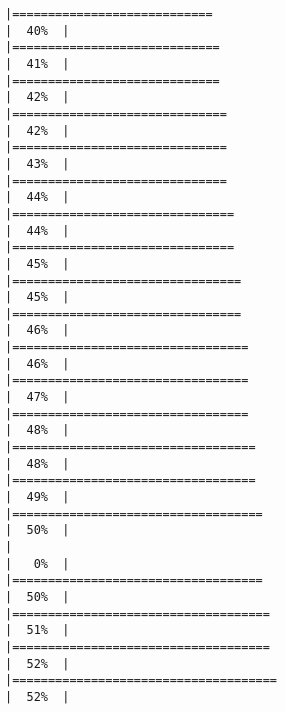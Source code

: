 \documentclass[
]{article}
\begin{document}
\begin{verbatim}
|============================                                          |  40%  |                                                                              |=============================                                         |  41%  |                                                                              |=============================                                         |  42%  |                                                                              |==============================                                        |  42%  |                                                                              |==============================                                        |  43%  |                                                                              |==============================                                        |  44%  |                                                                              |===============================                                       |  44%  |                                                                              |===============================                                       |  45%  |                                                                              |================================                                      |  45%  |                                                                              |================================                                      |  46%  |                                                                              |=================================                                     |  46%  |                                                                              |=================================                                     |  47%  |                                                                              |=================================                                     |  48%  |                                                                              |==================================                                    |  48%  |                                                                              |==================================                                    |  49%  |                                                                              |===================================                                   |  50%  |                                                                              |                                                                      |   0%  |                                                                              |===================================                                   |  50%  |                                                                              |====================================                                  |  51%  |                                                                              |====================================                                  |  52%  |                                                                              |=====================================                                 |  52%  |                                                                              
\end{verbatim}
\end{document}
